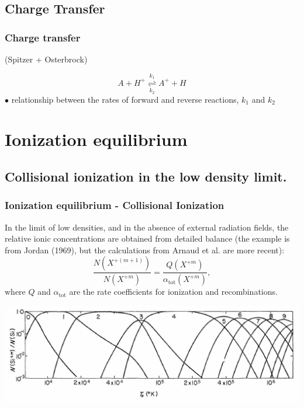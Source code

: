 \subsection{Charge Transfer}

\begin{frame}\frametitle{Charge transfer}

(Spitzer + Osterbrock) 

\[
A  + H^+  \overset{k_1}{\underset{k_2}{\rightleftharpoons}} A^+ + H
\]
{$\bullet$ relationship between the rates of forward and reverse
reactions, $k_1$ and $k_2$}


\end{frame}
\section{Ionization equilibrium}
\subsection{Collisional ionization in the low density limit.}

\begin{frame}\frametitle{Ionization equilibrium - Collisional Ionization}


In the limit of low densities, and in the absence of external
radiation fields, the relative ionic concentrations are obtained from
detailed balance (the example is from Jordan (1969), but the
calculations from Arnaud et al. are more recent):
\[
\frac{N(X^{+(m+1)})}{N(X^{+m})} =
\frac{Q(X^{+m})}{\alpha_\mathrm{tot}(X^{+m})},
\]
where $Q$ and $\alpha_\mathrm{tot}$ are the rate coefficients for
ionization and recombinations.

\begin{center}
  \includegraphics[width=\textwidth,height=!]{./C/colion_eq.jpg}
\end{center}

\end{frame}

